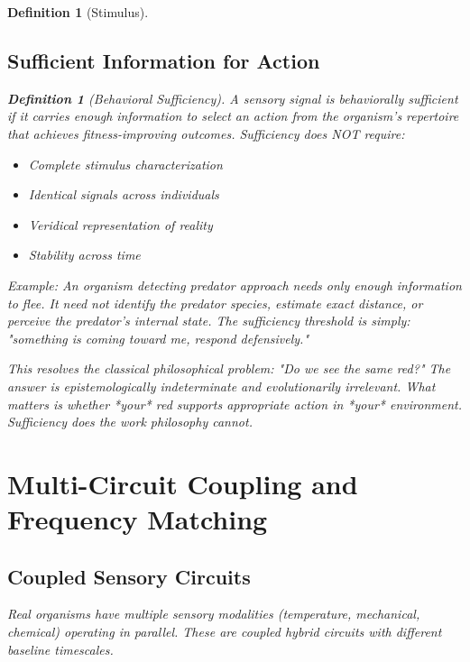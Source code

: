 \documentclass[twocolumn,10pt]{article}
\newtheorem{definition}[theorem]{Definition}
\theoremstyle{remark}
\begin{document}
\begin{definition}[Stimulus]
\subsection{Sufficient Information for Action}

\begin{definition}[Behavioral Sufficiency]
\label{def:sufficient}
A sensory signal is behaviorally sufficient if it carries enough information to select an action from the organism's repertoire that achieves fitness-improving outcomes. Sufficiency does NOT require:
\begin{itemize}
  \item Complete stimulus characterization
  \item Identical signals across individuals
  \item Veridical representation of reality
  \item Stability across time
\end{itemize}
\end{definition}

Example: An organism detecting predator approach needs only enough information to flee. It need not identify the predator species, estimate exact distance, or perceive the predator's internal state. The sufficiency threshold is simply: "something is coming toward me, respond defensively."

This resolves the classical philosophical problem: "Do we see the same red?" The answer is epistemologically indeterminate and evolutionarily irrelevant. What matters is whether *your* red supports appropriate action in *your* environment. Sufficiency does the work philosophy cannot.

\section{Multi-Circuit Coupling and Frequency Matching}
\label{sec:multimodal}

\subsection{Coupled Sensory Circuits}

Real organisms have multiple sensory modalities (temperature, mechanical, chemical) operating in parallel. These are coupled hybrid circuits with different baseline timescales.


\end{definition}
\end{document}
